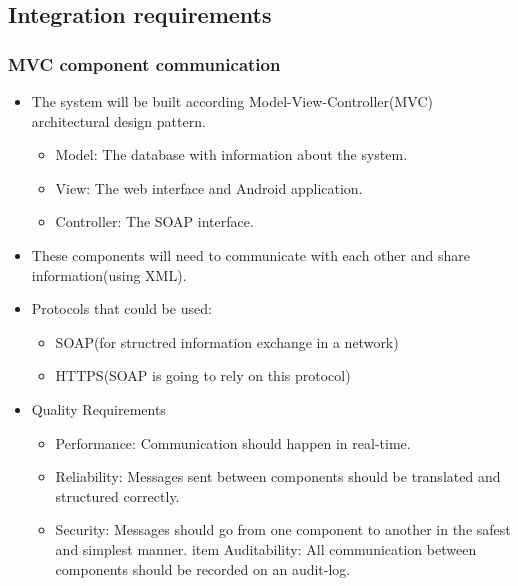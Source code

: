 \documentclass[11pt,a4paper]{article}
\begin{document}
\subsection{Integration requirements}
\subsubsection{MVC component communication}
\begin{itemize}
		\item The system will be built according Model-View-Controller(MVC) architectural design pattern.
			\begin{itemize}
			\item Model: The database with information about the system.
			\item View: The web interface and Android application.
			\item Controller: The SOAP interface.
			\end{itemize} 
		\item These components will need to communicate with each other and share information(using XML).
\end{itemize}
	\begin{itemize}
		\item Protocols that could be used:
			\begin{itemize}
			\item SOAP(for structred information exchange in a network)
			\item HTTPS(SOAP is going to rely on this protocol)   	
			\end{itemize}
		\item Quality Requirements
			\begin{itemize}
			\item Performance: Communication should happen in real-time.
			\item Reliability: Messages sent between components should be translated and structured correctly.
			\item Security: Messages should go from one component to another in the safest and simplest manner. 
			item Auditability: All communication between components should be recorded on an audit-log. 
			\end{itemize}	
	\end{itemize}

	
\end{document}

